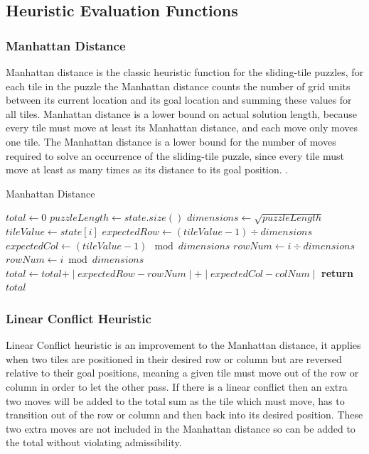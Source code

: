 \documentclass[final]{cmpreport}
\begin{document}
\subsection{Heuristic Evaluation Functions}
\subsubsection{Manhattan Distance}
Manhattan distance is the classic heuristic function for the sliding-tile puzzles, for each tile in the puzzle the Manhattan distance counts the number of grid units between its current location
and its goal location and summing these values for all tiles. Manhattan distance is a lower bound on actual solution length, because every tile must move at least its Manhattan distance, and each move only moves one tile. The Manhattan distance is a lower bound for the number of moves required to solve an occurrence of the sliding-tile puzzle, since every tile must move at least as many times as its distance to its goal position. \citep{DBLP:conf/ccgrid/LinnertSB14}.



	
\begin{algorithm}
	\caption{Manhattan Distance}\label{Manhattan Distance}
	\begin{algorithmic}[1]
			
		\State$total\gets 0$
		\State$puzzleLength\gets state.size()$
		\State$dimensions\gets \sqrt{puzzleLength}$
			
		\State $tileValue\gets state[i]$
		\State $expectedRow\gets (tileValue -1)\div dimensions$
		\State $expectedCol\gets (tileValue -1)\mod dimensions$
		\State $rowNum \gets i\div dimensions$
		\State $rowNum\gets i \bmod dimensions$
		\State $total\gets total \texttt{+} \mid{expectedRow-rowNum}\mid\texttt{+}\mid{expectedCol-colNum}\mid$
		\EndFor
		\State \textbf{return} $total$
		\EndProcedure
	\end{algorithmic}
\end{algorithm}



\subsubsection{Linear Conflict Heuristic}
Linear Conflict heuristic is an improvement to the Manhattan distance, it applies when two tiles are positioned in their desired row or column but are reversed relative to
their goal positions, meaning a given tile must move out of the row or column in order to let the other pass. If there is a linear conflict then an extra two moves will be added to the total sum as the tile which must move, has to transition out of the row or column and then back into its desired position. These two extra moves are not included in the Manhattan distance so can be added to the total without violating admissibility.
\end{document}
